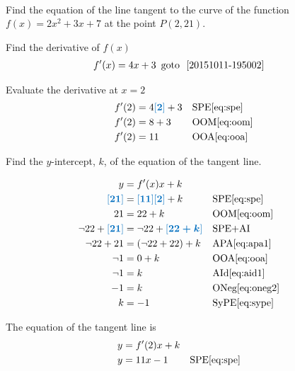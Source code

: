 \documentclass[20150903-160354-rs2.2-MarksMathNotebook.tex]{subfiles}
\begin{document}
\begin{example}[id:20151011-154209] \label{20151011-154209} \hfill \\
Find the equation of the line tangent to the curve of the function $f(x)=2x^2+3x+7$ at the point $P(2, 21)$.

\soln

\solnsteps

Find the derivative of $f(x)$
\begin{align*}
f'(x) &= 4x+3 \text{\, goto \,} \, \ref{20151011-195002}
\end{align*}

Evaluate the derivative at $x=2$
\begin{align*}
f'(2) & = 4\farg{2}+3 && \text{SPE} \eqref{eq:spe} \\
f'(2) &= 8+3 && \text{OOM} \eqref{eq:oom} \\
f'(2) &= 11 && \text{OOA} \eqref{eq:ooa} 
\end{align*}

Find the $y$-intercept, $k$, of the equation of the tangent line.

\begin{align*}
y &= f'(x)x + k\\
\farg{21} & = \farg{11}\farg{2} + k && \text{SPE} \eqref{eq:spe} \\
21 & = 22 + k && \text{OOM} \eqref{eq:oom} \\
\neg 22 + \farg{21} &= \neg 22 + \farg{22+k} && \text{SPE+AI}\\ 
\neg 22 + 21 & = (\neg 22 + 22) + k && \text{APA} \eqref{eq:apa1} \\
\neg 1 &= 0 + k && \text{OOA} \eqref{eq:ooa} \\
\neg 1 &= k && \text{AId} \eqref{eq:aid1} \\
-1 &= k && \text{ONeg} \eqref{eq:oneg2} \\
k &= -1 && \text{SyPE} \eqref{eq:sype} 
\end{align*}

The equation of the tangent line is
\begin{align*}
y & = f'(2)x+k \\
y &= 11x - 1 && \text{SPE} \eqref{eq:spe} 
\end{align*}

\end{example}
\end{document}
